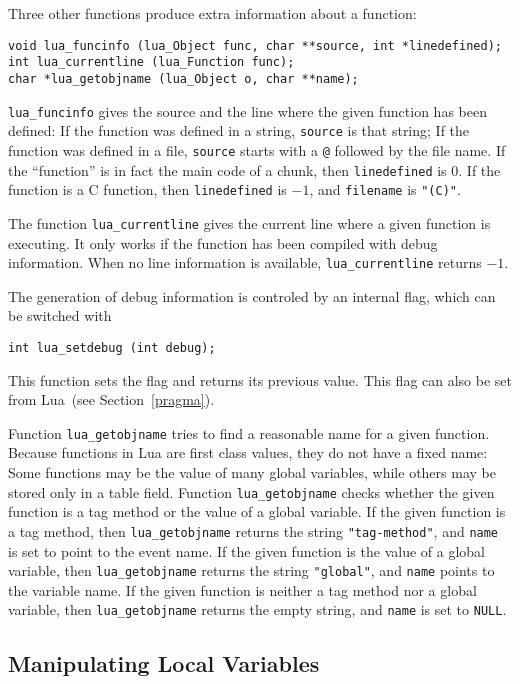 \documentclass[11pt]{article}
\newcommand{\See}[1]{Section~\ref{#1}}
\newcommand{\see}[1]{(see \See{#1})}
\newcommand{\Math}[1]{$#1$}
\begin{document}
Three other functions produce extra information about a function:
\begin{verbatim}
void lua_funcinfo (lua_Object func, char **source, int *linedefined);
int lua_currentline (lua_Function func);
char *lua_getobjname (lua_Object o, char **name);
\end{verbatim}
\verb|lua_funcinfo| gives the source and the line where the
given function has been defined:
If the function was defined in a string,
\verb|source| is that string;
If the function was defined in a file,
\verb|source| starts with a \verb|@| followed by the file name.
If the ``function'' is in fact the main code of a chunk,
then \verb|linedefined| is 0.
If the function is a C function,
then \verb|linedefined| is \Math{-1}, and \verb|filename| is \verb|"(C)"|.

The function \verb|lua_currentline| gives the current line where
a given function is executing.
It only works if the function has been compiled with debug
information.
When no line information is available,
\verb|lua_currentline| returns \Math{-1}.

The generation of debug information is controled by an internal flag,
which can be switched with
\begin{verbatim}
int lua_setdebug (int debug);
\end{verbatim}
This function sets the flag and returns its previous value.
This flag can also be set from Lua~\see{pragma}.

Function \verb|lua_getobjname| tries to find a reasonable name for
a given function.
Because functions in Lua are first class values,
they do not have a fixed name:
Some functions may be the value of many global variables,
while others may be stored only in a table field.
Function \verb|lua_getobjname| checks whether the given
function is a tag method or the value of a global variable.
If the given function is a tag method, then \verb|lua_getobjname|
returns the string \verb|"tag-method"|,
and \verb|name| is set to point to the event name.
If the given function is the value of a global variable,
then \verb|lua_getobjname| returns the string \verb|"global"|,
and \verb|name| points to the variable name.
If the given function is neither a tag method nor a global variable,
then \verb|lua_getobjname| returns the empty string,
and \verb|name| is set to \verb|NULL|.

\subsection{Manipulating Local Variables}
\end{document}
